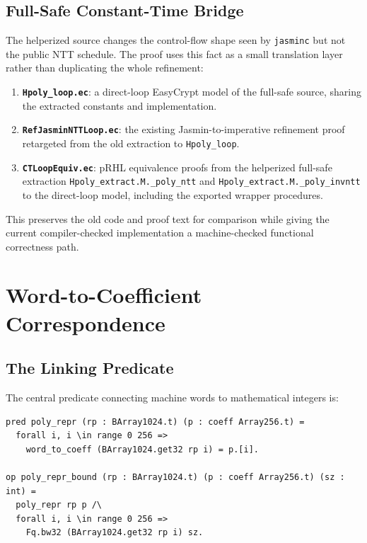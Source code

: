 \subsection{Full-Safe Constant-Time Bridge}

The helperized source changes the control-flow shape seen by \texttt{jasminc}
but not the public NTT schedule.  The proof uses this fact as a small
translation layer rather than duplicating the whole refinement:
\begin{enumerate}
  \item \textbf{\texttt{Hpoly\_loop.ec}}: a direct-loop EasyCrypt model of the
        full-safe source, sharing the extracted constants and
         implementation.
  \item \textbf{\texttt{RefJasminNTT\allowbreak Loop.ec}}: the existing Jasmin-to-imperative
        refinement proof retargeted from the old extraction to
        \texttt{Hpoly\_loop}.
  \item \textbf{\texttt{CTLoopEquiv.ec}}: pRHL equivalence proofs from the
        helperized full-safe extraction \texttt{Hpoly\_extract.M.\_poly\_ntt}
        and \texttt{Hpoly\_extract.M.\_poly\_invntt} to the direct-loop model,
        including the exported wrapper procedures.
\end{enumerate}

This preserves the old code and proof text for comparison while giving the
current compiler-checked implementation a machine-checked functional
correctness path.

\section{Word-to-Coefficient Correspondence}

\subsection{The Linking Predicate}

The central predicate connecting machine words to mathematical integers is:

\begin{lstlisting}[language=EasyCrypt,
  caption={Array correspondence predicate in \texttt{RefJasminNTT.ec}},
  label={lst:poly-repr}]
pred poly_repr (rp : BArray1024.t) (p : coeff Array256.t) =
  forall i, i \in range 0 256 =>
    word_to_coeff (BArray1024.get32 rp i) = p.[i].

op poly_repr_bound (rp : BArray1024.t) (p : coeff Array256.t) (sz : int) =
  poly_repr rp p /\
  forall i, i \in range 0 256 =>
    Fq.bw32 (BArray1024.get32 rp i) sz.
\end{lstlisting}

